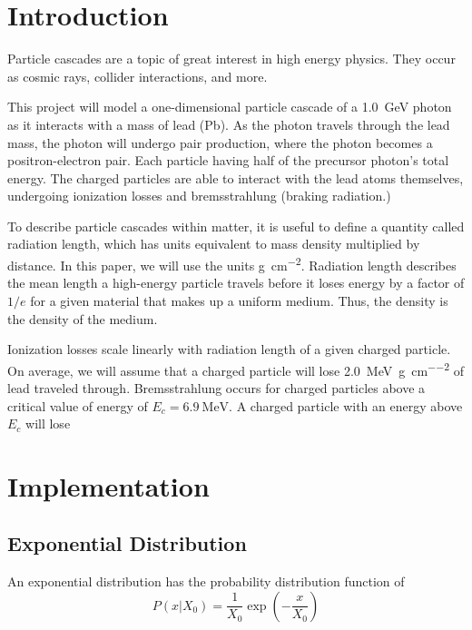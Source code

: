 \documentclass{article}
\title{\vspace{-3em}{\bf Studying High-Energy Particle Cascades with One-Dimensional Monte-Carlo Simulations}}
\author{Matt Ketkaroonkul}
\date{\today}
\newcommand{\radlen}{\gram\per\cm^2}
\begin{document}
\maketitle

\begin{abstract}
    Write the abstract last.
    
\end{abstract}

\section{Introduction} %
\label{sec:Introduction}
Particle cascades are a topic of great interest in high energy physics. They occur as cosmic rays, collider interactions, and more.

This project will model a one-dimensional particle cascade of a \SI{1.0}{\giga\eV} photon as it interacts with a mass of lead (Pb). As the photon travels through the lead mass, the photon will undergo pair production, where the photon becomes a positron-electron pair. Each particle having half of the precursor photon's total energy. The charged particles are able to interact with the lead atoms themselves, undergoing ionization losses and bremsstrahlung (braking radiation.)

To describe particle cascades within matter, it is useful to define a quantity called radiation length, which has units equivalent to mass density multiplied by distance. In this paper, we will use the units \unit{\radlen}. Radiation length describes the mean length a high-energy particle travels before it loses energy by a factor of \( 1 / e \) for a given material that makes up a uniform medium. Thus, the density is the density of the medium.

Ionization losses scale linearly with radiation length of a given charged particle. On average, we will assume that a charged particle will lose \SI{2.0}{\mega\eV\per\radlen} of lead traveled through. Bremsstrahlung occurs for charged particles above a critical value of energy of \( E_c = \SI{6.9}{\mega\eV}\). A charged particle with an energy above \( E_c \) will lose 

\section{Implementation} %
\label{sec:Implementation}
\subsection{Exponential Distribution} %
\label{sub:Exponential Distribution}
An exponential distribution has the probability distribution function of
\begin{equation}
    P(x|X_{0}) = \frac{1}{X_{0}} \exp \left( -\frac{x}{X_{0}} \right) 
\end{equation}
\end{document}
